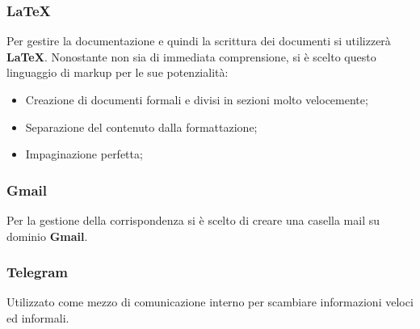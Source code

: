 	\subsubsection{\LaTeX{}}
		Per gestire la documentazione e quindi la scrittura dei documenti si utilizzerà \textbf{\LaTeX}. Nonostante non sia di immediata comprensione, si è scelto questo linguaggio di markup per le sue potenzialità:
		\begin{itemize}
			\item Creazione di documenti formali e divisi in sezioni molto velocemente;
			\item Separazione del contenuto dalla formattazione;
			\item Impaginazione perfetta;
		\end{itemize}
	
	\subsubsection{Gmail}
		Per la gestione della corrispondenza si è scelto di creare una casella mail su dominio \textbf{Gmail}.
		
	\subsubsection{Telegram}
		Utilizzato come mezzo di comunicazione interno per scambiare informazioni veloci ed informali.
		



